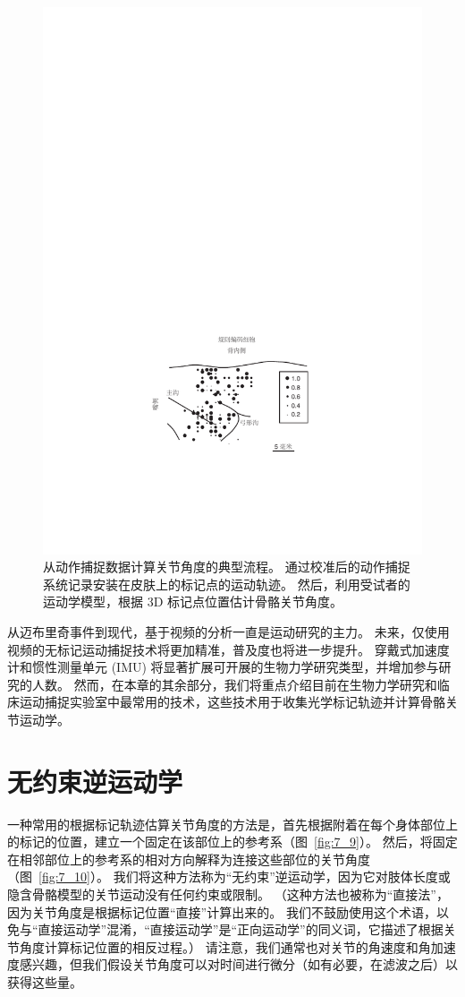 \begin{figure}[!htb]
	\centering
	\includegraphics[width=0.75\linewidth]{chap7/7_8}
	\caption{从动作捕捉数据计算关节角度的典型流程。
		通过校准后的动作捕捉系统记录安装在皮肤上的标记点的运动轨迹。
		然后，利用受试者的运动学模型，根据 3D 标记点位置估计骨骼关节角度。 \label{fig:7_8}}
\end{figure}


从迈布里奇事件到现代，基于视频的分析一直是运动研究的主力。
未来，仅使用视频的无标记运动捕捉技术将更加精准，普及度也将进一步提升。
穿戴式加速度计和惯性测量单元 (IMU) 将显著扩展可开展的生物力学研究类型，并增加参与研究的人数。
然而，在本章的其余部分，我们将重点介绍目前在生物力学研究和临床运动捕捉实验室中最常用的技术，这些技术用于收集光学标记轨迹并计算骨骼关节运动学。


\section{无约束逆运动学}

一种常用的根据标记轨迹估算关节角度的方法是，首先根据附着在每个身体部位上的标记的位置，建立一个固定在该部位上的参考系（图~\ref{fig:7_9}）。
然后，将固定在相邻部位上的参考系的相对方向解释为连接这些部位的关节角度（图~\ref{fig:7_10}）。
我们将这种方法称为“无约束”逆运动学，因为它对肢体长度或隐含骨骼模型的关节运动没有任何约束或限制。 
（这种方法也被称为“直接法”，因为关节角度是根据标记位置“直接”计算出来的。
我们不鼓励使用这个术语，以免与“直接运动学”混淆，“直接运动学”是“正向运动学”的同义词，它描述了根据关节角度计算标记位置的相反过程。）
请注意，我们通常也对关节的角速度和角加速度感兴趣，但我们假设关节角度可以对时间进行微分（如有必要，在滤波之后）以获得这些量。


